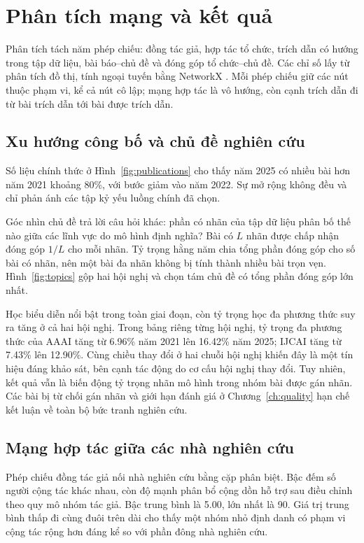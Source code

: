 \chapter{Phân tích mạng và kết quả}
\label{ch:analysis}
Phân tích tách năm phép chiếu: đồng tác giả, hợp tác tổ chức, trích dẫn có hướng
trong tập dữ liệu, bài báo--chủ đề và đóng góp tổ chức--chủ đề. Các chỉ số lấy
từ phân tích đồ thị, tính ngoại tuyến bằng NetworkX \citep{networkxDocs}.
Mỗi phép chiếu giữ các nút thuộc phạm vi, kể cả nút cô lập; mạng hợp tác là vô
hướng, còn cạnh trích dẫn đi từ bài trích dẫn tới bài được trích dẫn.

\section{Xu hướng công bố và chủ đề nghiên cứu}
Số liệu chính thức ở Hình~\ref{fig:publications} cho thấy năm 2025 có nhiều
bài hơn năm 2021 khoảng 80\%, với bước giảm vào năm 2022. Sự mở rộng không
đều và chỉ phản ánh các tập kỷ yếu luồng chính đã chọn.

Góc nhìn chủ đề trả lời câu hỏi khác: phần có nhãn của tập dữ liệu phân bố thế
nào giữa các lĩnh vực do mô hình định nghĩa? Bài có $L$ nhãn được chấp nhận
đóng góp $1/L$ cho mỗi nhãn. Tỷ trọng hằng năm chia tổng phần đóng góp cho số
bài có nhãn, nên một bài đa nhãn không bị tính thành nhiều bài trọn vẹn.
Hình~\ref{fig:topics} gộp hai hội nghị và chọn tám chủ đề có tổng phần đóng góp
lớn nhất.

\FloatBarrier

Học biểu diễn nổi bật trong toàn giai đoạn, còn tỷ trọng học đa phương thức
suy ra tăng ở cả hai hội nghị. Trong bảng riêng từng hội nghị, tỷ trọng đa
phương thức của AAAI tăng từ 6.96\% năm 2021 lên 16.42\% năm 2025; IJCAI tăng
từ 7.43\% lên 12.90\%. Cùng chiều thay đổi ở hai chuỗi hội nghị khiến đây là
một tín hiệu đáng khảo sát, bên cạnh tác động do cơ cấu hội nghị thay đổi.
Tuy nhiên, kết quả vẫn là biến động tỷ trọng nhãn mô hình trong nhóm bài được
gán nhãn. Các bài bị từ chối gán nhãn và giới hạn đánh giá ở Chương~\ref{ch:quality}
hạn chế kết luận về toàn bộ bức tranh nghiên cứu.

\section{Mạng hợp tác giữa các nhà nghiên cứu}
Phép chiếu đồng tác giả nối \Researchers{} nhà nghiên cứu bằng
\CoauthorPairs{} cặp phân biệt. Bậc đếm số người cộng tác khác nhau, còn độ
mạnh phân bổ cộng dồn hỗ trợ sau điều chỉnh theo quy mô nhóm tác giả. Bậc trung
bình là 5.00, lớn nhất là 90. Giá trị trung bình thấp đi cùng đuôi trên dài cho
thấy một nhóm nhỏ định danh có phạm vi cộng tác rộng hơn đáng kể so với phần
đông nhà nghiên cứu.


